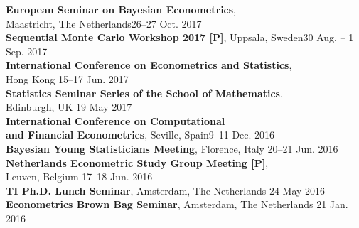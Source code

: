 \documentclass[margin,line]{resume}
\begin{document}
\begin{resume}
	\textbf{ European Seminar on Bayesian Econometrics},\\
	 Maastricht, The Netherlands\hfill 26--27 Oct. 2017 \vspace{1mm} \\ 
	\textbf{Sequential Monte Carlo Workshop 2017 [P]}, Uppsala, Sweden\hfill 30 Aug. -- 1 Sep. 2017 \vspace{1mm} \\ 
	\textbf{ International Conference on Econometrics and Statistics},\\ Hong Kong \hfill 15--17 Jun. 2017 \vspace{1mm} \\    
    \textbf{Statistics Seminar Series of the School of Mathematics},\\ Edinburgh, UK \hfill 19 May 2017 \vspace{1mm} \\ 
    \textbf{ International Conference on Computational \\ and Financial Econometrics},  Seville, Spain\hfill 9--11 Dec. 2016  \vspace{1mm} \\ 
	\textbf{ Bayesian Young Statisticians Meeting}, Florence, Italy \hfill 20--21 Jun. 2016  \vspace{1mm} \\ 
	\textbf{ Netherlands Econometric Study Group Meeting [P]},\\
    Leuven, Belgium \hfill 17--18 Jun. 2016  \vspace{1mm} \\ 
    \textbf{TI Ph.D. Lunch Seminar}, Amsterdam, The Netherlands \hfill 24 May 2016  \vspace{1mm} \\ 
	\textbf{Econometrics Brown Bag Seminar}, Amsterdam, The Netherlands \hfill 21 Jan. 2016\\ 
  

\vspace{-5mm}
\newpage

\end{resume}
\end{document}
